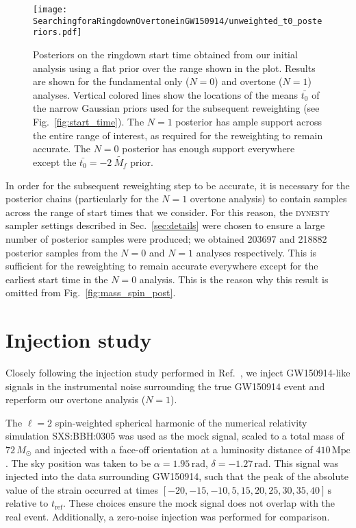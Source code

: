 \begin{figure}[t]
	\centering
	\texttt{[image: SearchingforaRingdownOvertoneinGW150914/unweighted\_t0\_posteriors.pdf]}
	\caption[Posteriors on the GW150914 ringdown start time]{ 
		Posteriors on the ringdown start time obtained from our initial analysis using a flat prior over the range shown in the plot.
		Results are shown for the fundamental only ($N=0$) and overtone ($N=1$) analyses.
		Vertical colored lines show the locations of the means $\bar{t_0}$ of the narrow Gaussian priors used for the subsequent reweighting (see Fig.~\ref{fig:start_time}).
		The $N=1$ posterior has ample support across the entire range of interest, as required for the reweighting to remain accurate.
		The $N=0$ posterior has enough support everywhere except the $\bar{t_0}=-2\ \tilde{M_f}$ prior.
	}
	\label{fig:t0_posterior}
\end{figure}

In order for the subsequent reweighting step to be accurate, it is necessary for the posterior chains (particularly for the $N=1$ overtone analysis) to contain samples across the range of start times that we consider. 
For this reason, the \textsc{dynesty} sampler settings described in Sec.~\ref{sec:details} were chosen to ensure a large number of posterior samples were produced; we obtained 203697 and 218882 posterior samples from the $N=0$ and $N=1$ analyses respectively. 
This is sufficient for the reweighting to remain accurate everywhere except for the earliest start time in the $N=0$ analysis. 
This is the reason why this result is omitted from Fig.~\ref{fig:mass_spin_post}.


\section{Injection study}\label{app:inj}

Closely following the injection study performed in Ref.~\cite{Cotesta:2022pci}, we inject GW150914-like signals in the instrumental noise surrounding the true GW150914 event and reperform our overtone analysis ($N=1$).

The $\ell=2$ spin-weighted spherical harmonic of the numerical relativity simulation SXS:BBH:0305 \cite{2016CQGra..33x4002L, sxs_catalog} was used as the mock signal, scaled to a total mass of $72\,M_\odot$ and injected with a face-off orientation at a luminosity distance of $410\,\mathrm{Mpc}$. 
The sky position was taken to be $\alpha = 1.95\,\mathrm{rad}$, $\delta=-1.27\,\mathrm{rad}$.
This signal was injected into the data surrounding GW150914, such that the peak of the absolute value of the strain occurred at times $[-20, -15, -10, 5, 15, 20, 25, 30, 35, 40]\,\mathrm{s}$ relative to $t_\mathrm{ref}$.
These choices ensure the mock signal does not overlap with the real event.
Additionally, a zero-noise injection was performed for comparison. 

